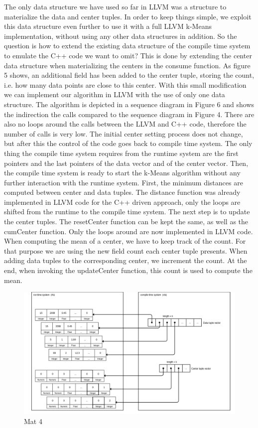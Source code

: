 The only data structure we have used so far in LLVM was a structure to materialize the data and center tuples. In order to keep things simple, we exploit this data structure even further to use it with a full LLVM k-Means implementation, without using any other data structures in addition.
So the question is how to extend the existing data structure of the compile time system to emulate the C++ code we want to omit? This is done by extending the center data structure when materializing the centers in the consume function. As figure 5 shows, an additional field has been added to the center tuple, storing the count, i.e. how many data points are close to this center. With this small modification we can implement our algorithm in LLVM with the use of only one data structure.
The algorithm is depicted in a sequence diagram in Figure 6 and shows the  indirection the calls compared to the sequence diagram in Figure 4. There are also no loops around the calls between the LLVM and C++ code, therefore the number of calls is very low. 
The initial center setting process does not change, but after this the control of the code goes back to compile time system. The only thing the compile time system requires from the runtime system are the first pointers and the last pointers of the data vector and of the center vector. Then, the compile time system is ready to start the k-Means algorithm without any further interaction with the runtime system. 
First, the minimum distances are computed between center and data tuples. The distance function was already implemented in LLVM code for the C++ driven approach, only the loops are shifted from the runtime to the compile time system. 
The next step is to update the center tuples. The resetCenter function can be kept the same, as well as the cumCenter function. Only the loops around are now implemented in LLVM code. When computing the mean of a center, we have to keep track of the count. For that purpose we are using the new field count each center tuple presents. When adding data tuples to the corresponding center, we increment the count. At the end, when invoking the updateCenter function, this count is used to compute the mean. 



\begin{figure}[htsb]
  \centering
  \includegraphics[scale=0.25]{figures/mat4}
  \caption[mat 4]{Mat 4}
  \label{fig:mat4}
\end{figure}


